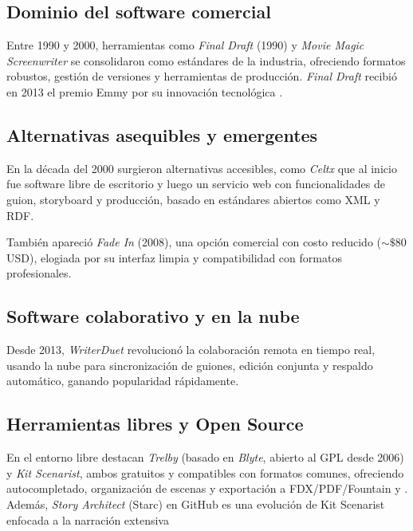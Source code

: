 \documentclass[12pt]{article}
\begin{document}
	\subsection{Dominio del software comercial}
	{\sloppy
		Entre 1990 y 2000, herramientas como \textit{Final Draft} (1990) y \textit{Movie Magic Screenwriter} se consolidaron como estándares de la industria, ofreciendo formatos robustos, gestión de versiones y herramientas de producción. \textit{Final Draft} recibió en 2013 el premio Emmy por su innovación tecnológica \parencite{turn0search22FinalDraft,turn0search27MovieMagic}.
	}

	\subsection{Alternativas asequibles y emergentes}
	{\sloppy
		En la década del 2000 surgieron alternativas accesibles, como \textit{Celtx} \parencite{turn0search23Celtx} que al inicio fue software libre de escritorio y luego un servicio web con funcionalidades de guion, storyboard y producción, basado en estándares abiertos como XML y RDF\@.

		También apareció \textit{Fade In} (2008), \parencite{turn0search22FinalDraft} una opción comercial con costo reducido (\ensuremath{\sim\$80} USD), elogiada por su interfaz limpia y compatibilidad con formatos profesionales.
	}

	\subsection{Software colaborativo y en la nube}
	Desde 2013, \textit{WriterDuet} \parencite{turn0search24WriterDuet} revolucionó la colaboración remota en tiempo real, usando la nube para sincronización de guiones, edición conjunta y respaldo automático, ganando popularidad rápidamente.

	\subsection{Herramientas libres y Open Source}
	En el entorno libre destacan \textit{Trelby} (basado en \textit{Blyte}, abierto al GPL desde 2006) y \textit{Kit Scenarist}, ambos gratuitos y compatibles con formatos comunes, ofreciendo autocompletado, organización de escenas y exportación a FDX/PDF/Fountain \parencite{turn0search21Trelby} y \parencite{turn0search11KitScenarist}. Además, \textit{Story Architect} (Starc) en GitHub es una evolución de Kit Scenarist enfocada a la narración extensiva \parencite{turn0search17StoryArchitect}
\end{document}
